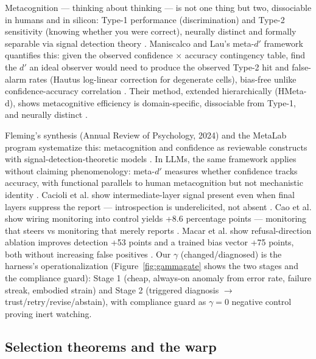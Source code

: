 \documentclass[11pt]{article}
\begin{document}
Metacognition --- thinking about thinking --- is not one thing but two, dissociable in humans and in silicon: Type-1 performance (discrimination) and Type-2 sensitivity (knowing whether you were correct), neurally distinct and formally separable via signal detection theory \citep{cacioli2026,maniscalco2012}. Maniscalco and Lau's meta-$d'$ framework quantifies this: given the observed confidence $\times$ accuracy contingency table, find the $d'$ an ideal observer would need to produce the observed Type-2 hit and false-alarm rates (Hautus log-linear correction for degenerate cells), bias-free unlike confidence-accuracy correlation \citep{maniscalco2012,cacioli2026}. Their method, extended hierarchically (HMeta-d), shows metacognitive efficiency is domain-specific, dissociable from Type-1, and neurally distinct \citep{cacioli2026}.

Fleming's synthesis (Annual Review of Psychology, 2024) and the MetaLab program systematize this: metacognition and confidence as reviewable constructs with signal-detection-theoretic models \citep{fleming2024}. In LLMs, the same framework applies without claiming phenomenology: meta-$d'$ measures whether confidence tracks accuracy, with functional parallels to human metacognition but not mechanistic identity \citep{cacioli2026}. Cacioli et al. show intermediate-layer signal present even when final layers suppress the report --- introspection is underelicited, not absent \citep{cacioli2026}. Cao et al. show wiring monitoring into control yields +8.6 percentage points --- monitoring that steers vs monitoring that merely reports \citep{cao2026}. Macar et al. show refusal-direction ablation improves detection +53 points and a trained bias vector +75 points, both without increasing false positives \citep{macar2026}. Our $\gamma$ (changed/diagnosed) is the harness's operationalization (Figure~\ref{fig:gammagate} shows the two stages and the compliance guard): Stage 1 (cheap, always-on anomaly from error rate, failure streak, embodied strain) and Stage 2 (triggered diagnosis $\to$\allowbreak{} trust/retry/revise/abstain), with compliance guard as $\gamma=0$ negative control proving inert watching.

\subsection{Selection theorems and the warp}
\end{document}
